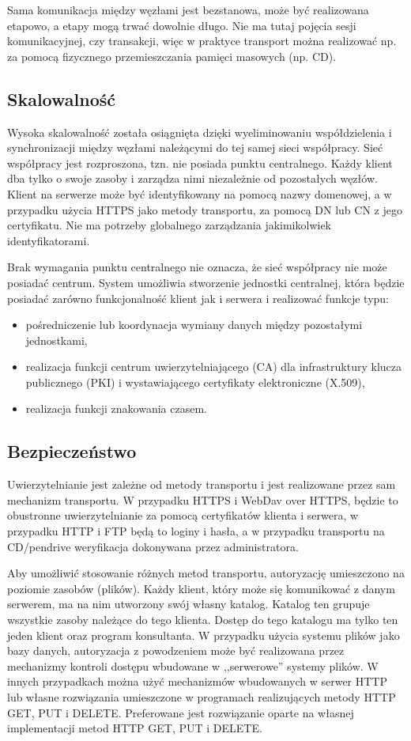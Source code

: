 \documentclass[a4paper]{article}
\begin{document}
Sama komunikacja między węzłami jest bezstanowa, może być realizowana etapowo,
a etapy mogą trwać dowolnie długo. Nie ma tutaj pojęcia sesji komunikacyjnej,
czy transakcji, więc w praktyce transport można realizować np. za pomocą
fizycznego przemieszczania pamięci masowych (np. CD).

\subsection{Skalowalność}

Wysoka skalowalność została osiągnięta dzięki wyeliminowaniu współdzielenia i
synchronizacji między węzłami należącymi do tej samej sieci współpracy. Sieć współpracy
jest rozproszona, tzn. nie posiada punktu centralnego. Każdy klient dba tylko o swoje
zasoby i zarządza nimi niezależnie od pozostałych węzłów. Klient na serwerze może być
identyfikowany na pomocą nazwy domenowej, a w przypadku użycia HTTPS jako metody
transportu, za pomocą DN lub CN z jego certyfikatu. Nie ma potrzeby globalnego zarządzania
jakimikolwiek identyfikatorami.

Brak wymagania punktu centralnego nie oznacza, że sieć współpracy nie może posiadać
centrum. System umożliwia stworzenie jednostki centralnej, która będzie posiadać zarówno
funkcjonalność klient jak i serwera i realizować funkcje typu:
\begin{itemize}
  \item pośredniczenie lub koordynacja wymiany danych między pozostałymi jednostkami,  
  \item realizacja funkcji centrum uwierzytelniającego (CA) dla infrastruktury klucza
  publicznego (PKI) i wystawiającego certyfikaty elektroniczne (X.509),
  \item realizacja funkcji znakowania czasem.
\end{itemize}

\subsection{Bezpieczeństwo}

Uwierzytelnianie jest zależne od metody transportu i jest realizowane przez sam
mechanizm transportu. W przypadku HTTPS i WebDav over HTTPS, będzie to obustronne
uwierzytelnianie za pomocą certyfikatów klienta i serwera, w przypadku HTTP i
FTP będą to loginy i hasła, a w przypadku transportu na CD/pendrive weryfikacja
dokonywana przez administratora.

Aby umożliwić stosowanie różnych metod transportu, autoryzację umieszczono na
poziomie zasobów (plików). Każdy klient, który może się komunikować z danym
serwerem, ma na nim utworzony swój własny katalog. Katalog ten grupuje wszystkie
zasoby należące do tego klienta. Dostęp do tego katalogu ma tylko ten jeden
klient oraz program konsultanta. W przypadku użycia systemu plików jako bazy
danych, autoryzacja z powodzeniem może być realizowana przez mechanizmy
kontroli dostępu wbudowane w ,,serwerowe'' systemy plików. W innych przypadkach można
użyć mechanizmów wbudowanych w serwer HTTP lub własne rozwiązania umieszczone w
programach realizujących metody HTTP GET, PUT i DELETE. Preferowane jest rozwiązanie
oparte na własnej implementacji metod HTTP GET, PUT i DELETE.
\end{document}
